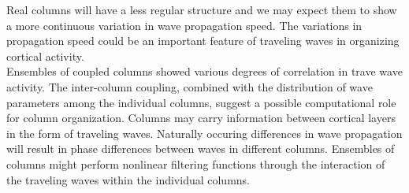 \documentclass[a4paper,11pt]{article}
\begin{document}
Real columns will have a less regular structure and we may expect them to show a more continuous variation in wave propagation speed. 
The variations in propagation speed could be an important feature of traveling waves in organizing cortical activity.
\\
Ensembles of coupled columns showed various degrees of correlation in trave wave activity. 
The inter-column coupling, combined with the distribution of wave parameters among the individual columns, suggest a possible computational role for column organization.
Columns may carry information between cortical layers in the form of traveling waves. 
Naturally occuring differences in wave propagation will result in phase differences between waves in different columns.
Ensembles of columns might perform nonlinear filtering functions through the interaction of the traveling waves within the individual columns.


\clearpage
\printbibliography
\end{document}
